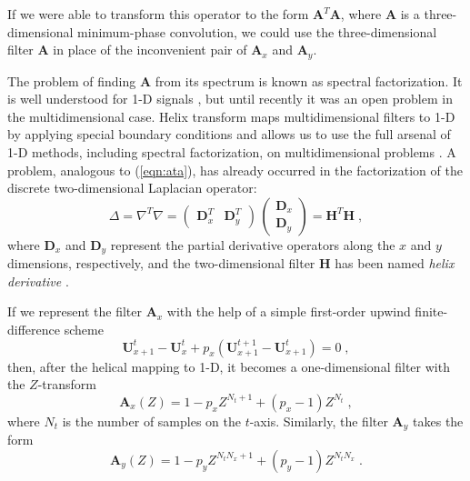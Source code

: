 If we were able to transform this operator to the form
$\mathbf{A}^T \mathbf{A}$, where $\mathbf{A}$ is a three-dimensional
minimum-phase convolution, we could use the three-dimensional filter
$\mathbf{A}$ in place of the inconvenient pair of $\mathbf{A}_x$ and
$\mathbf{A}_y$.
\par
The problem of finding $\mathbf{A}$ from its spectrum is known as
spectral factorization. It is well understood for 1-D signals
\cite[]{Claerbout.fgdp.76}, but until recently it was an open problem
in the multidimensional case. Helix transform maps multidimensional
filters to 1-D by applying special boundary conditions and allows us
to use the full arsenal of 1-D methods, including spectral
factorization, on multidimensional problems
\cite[]{GEO63-05-15321541}. A problem, analogous to (\ref{eqn:ata}),
has already occurred in the factorization of the discrete
two-dimensional Laplacian operator:
\begin{equation}
\label{eqn:lap}
\Delta = \nabla^T \nabla = 
\left(\begin{array}{cc}\displaystyle \mathbf{D}_x^T & \mathbf{D}_y^T
      \end{array}\right)\,
\left(\begin{array}{c}\displaystyle
\mathbf{D}_x \\
\mathbf{D}_y
\end{array}\right) = \mathbf{H}^T \mathbf{H}\;,
\end{equation}
where $\mathbf{D}_x$ and $\mathbf{D}_y$ represent the partial derivative
operators along the $x$ and $y$ dimensions, respectively, and the
two-dimensional filter $\mathbf{H}$ has been named \emph{helix
  derivative} \cite[]{gee,Zhao.sep.100.yi1}.
\par
If we represent the filter $\mathbf{A}_x$ with the help of a simple first-order 
upwind finite-difference scheme 
\begin{equation}
\label{eqn:fin}
\mathbf{U}_{x+1}^t - \mathbf{U}_{x}^t + p_x \left(\mathbf{U}_{x+1}^{t+1} - \mathbf{U}_{x+1}^{t}\right) = 0\;,
\end{equation}
then, after the helical mapping to 1-D, it becomes a one-dimensional
filter with the $Z$-transform
\begin{equation}
\label{eqn:hlx}
\mathbf{A}_x (Z) = 1 - p_x Z^{N_t + 1} + (p_x - 1) Z^{N_t}\;,
\end{equation}
where $N_t$ is the number of samples on the $t$-axis. Similarly, the
filter $\mathbf{A}_y$ takes the form
\begin{equation}
\label{eqn:hly}
\mathbf{A}_y (Z) = 1 - p_y Z^{N_t N_x + 1} + (p_y - 1) Z^{N_t N_x}\;.
\end{equation}
